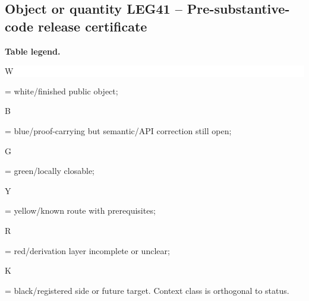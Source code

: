 \subsection*{Object or quantity LEG41 -- Pre-substantive-code release certificate}
\hypertarget{objproof:LEG41}{}
\par\smallskip\noindent\begin{minipage}{0.99\linewidth}\footnotesize\raggedright\textbf{Table legend.} \colorbox{white}{\strut W} = white/finished public object; \colorbox{cyan!20}{\strut B} = blue/proof-carrying but semantic/API correction still open; \colorbox{green!18}{\strut G} = green/locally closable; \colorbox{yellow!25}{\strut Y} = yellow/known route with prerequisites; \colorbox{red!20}{\strut R} = red/derivation layer incomplete or unclear; \colorbox{black!18}{\strut K} = black/registered side or future target. Context class is orthogonal to status.\end{minipage}\par\vspace{0.25em}

